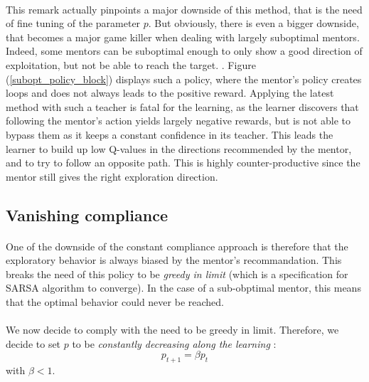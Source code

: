 \documentclass[a4paper]{report}
\begin{document}
{{{			\paragraph{} This remark actually pinpoints a major downside of this method, that is the need of fine tuning of the parameter $p$. But obviously, there is even a bigger downside, that becomes a major game killer when dealing with largely suboptimal mentors. Indeed, some mentors can be suboptimal enough to only show a good direction of exploitation, but not be able to reach the target. . Figure (\ref{subopt_policy_block}) displays such a policy, where the mentor's policy creates loops and does not always leads to the positive reward.  \newline
			Applying the latest method with such a teacher is fatal for the learning, as the learner discovers that following the mentor's action yields largely negative rewards, but is not able to bypass them as it keeps a constant confidence in its teacher. This leads the learner to build up low Q-values in the directions recommended by the mentor, and to try to follow an opposite path. This is highly counter-productive since the mentor still gives the right exploration direction. 
		
		\subsection{Vanishing compliance }
		{
			\paragraph{} One of the downside of the constant compliance approach is therefore that the exploratory behavior is always biased by the mentor's recommandation. This breaks the need of this policy to be \emph{greedy in limit} (which is a specification for SARSA algorithm to converge). In the case of a sub-obptimal mentor, this means that the optimal behavior could never be reached. 
			
			\paragraph{} We now decide to comply with the need to be greedy in limit. Therefore, we decide to set $p$ to be \emph{constantly decreasing along the learning} : 
			\begin{equation}
				p_{t+1} = \beta p_{t}
			\end{equation}
			with $\beta < 1$. 
			
}}}}
\end{document}
